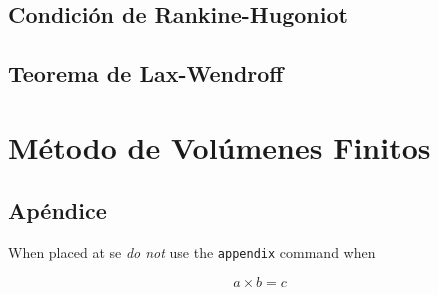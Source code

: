 \section{Condición de Rankine-Hugoniot}
\section{Teorema de Lax-Wendroff}

\chapter{Método de Volúmenes Finitos}

\section*{Apéndice}
%
When placed at se \textit{do not} use the \verb|appendix| command when

\begin{equation}
	a \times b = c
\end{equation}



